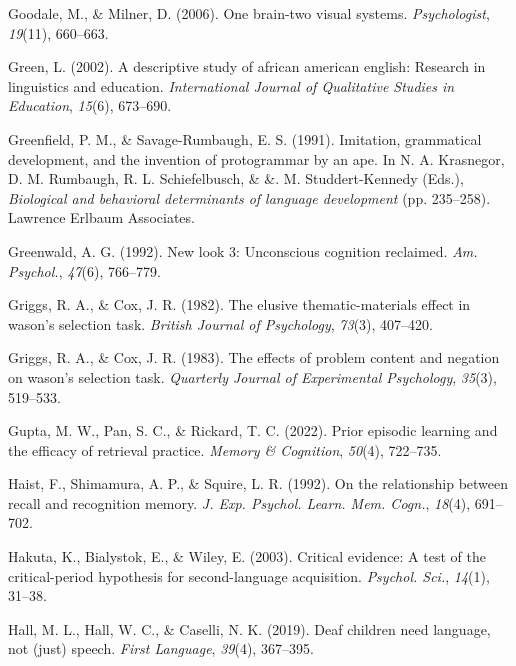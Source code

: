 \documentclass[
]{krantz}
\newlength{\cslhangindent}
\newenvironment{CSLReferences}[2] %
 {\begin{list}{}{%
  \setlength{\itemindent}{0pt}
  \setlength{\leftmargin}{0pt}
  \setlength{\parsep}{0pt}
  \ifodd #1
   \setlength{\leftmargin}{\cslhangindent}
   \setlength{\itemindent}{-1\cslhangindent}
  \fi
  \setlength{\itemsep}{#2\baselineskip}}}
 {\end{list}}
\begin{document}
\begin{CSLReferences}{1}{0}
Goodale, M., \& Milner, D. (2006). One brain-two visual systems. \emph{Psychologist}, \emph{19}(11), 660--663.

Green, L. (2002). A descriptive study of african american english: Research in linguistics and education. \emph{International Journal of Qualitative Studies in Education}, \emph{15}(6), 673--690.

Greenfield, P. M., \& Savage-Rumbaugh, E. S. (1991). Imitation, grammatical development, and the invention of protogrammar by an ape. In N. A. Krasnegor, D. M. Rumbaugh, R. L. Schiefelbusch, \& \&. M. Studdert-Kennedy (Eds.), \emph{Biological and behavioral determinants of language development} (pp. 235--258). Lawrence Erlbaum Associates.

Greenwald, A. G. (1992). New look 3: Unconscious cognition reclaimed. \emph{Am. Psychol.}, \emph{47}(6), 766--779.

Griggs, R. A., \& Cox, J. R. (1982). The elusive thematic-materials effect in wason's selection task. \emph{British Journal of Psychology}, \emph{73}(3), 407--420.

Griggs, R. A., \& Cox, J. R. (1983). The effects of problem content and negation on wason's selection task. \emph{Quarterly Journal of Experimental Psychology}, \emph{35}(3), 519--533.

Gupta, M. W., Pan, S. C., \& Rickard, T. C. (2022). Prior episodic learning and the efficacy of retrieval practice. \emph{Memory \& Cognition}, \emph{50}(4), 722--735.

Haist, F., Shimamura, A. P., \& Squire, L. R. (1992). On the relationship between recall and recognition memory. \emph{J. Exp. Psychol. Learn. Mem. Cogn.}, \emph{18}(4), 691--702.

Hakuta, K., Bialystok, E., \& Wiley, E. (2003). Critical evidence: A test of the critical-period hypothesis for second-language acquisition. \emph{Psychol. Sci.}, \emph{14}(1), 31--38.

Hall, M. L., Hall, W. C., \& Caselli, N. K. (2019). Deaf children need language, not (just) speech. \emph{First Language}, \emph{39}(4), 367--395.


\end{CSLReferences}
\end{document}
